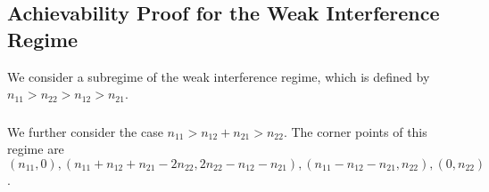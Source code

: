 \documentclass[12pt, draftclsnofoot, onecolumn]{IEEEtran}
\theoremstyle{definition}
\begin{document}







\subsection{Achievability Proof for the Weak Interference Regime}\label{sec:weak1}
We consider a subregime of the weak interference regime, which is defined by $n_{11}> n_{22}>n_{12}> n_{21}$. %



\subsubsection{}\label{weak01}
We further consider the case $n_{11}> n_{12}+n_{21}> n_{22}$. The corner points of this regime are $(n_{11},0), (n_{11}+n_{12}+n_{21}-2n_{22},2n_{22} - n_{12}- n_{21} ),(n_{11}-n_{12}-n_{21},n_{22}), (0,n_{22})$.
\end{document}
